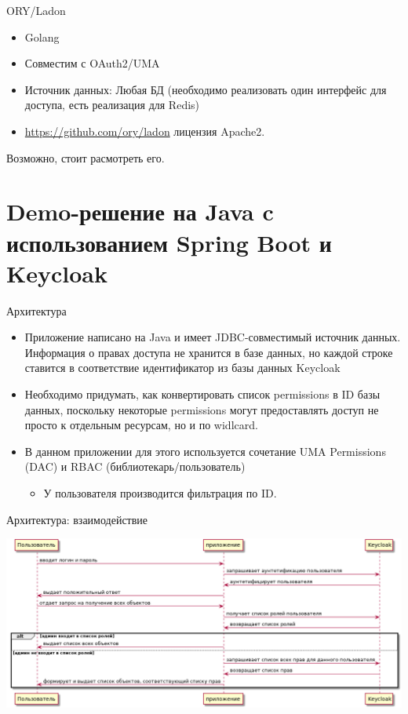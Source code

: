 \documentclass[presentation]{beamer}
\begin{document}
\begin{frame}[label={sec:org1e8935c}]{ORY/Ladon}
\begin{itemize}
\item Golang
\item Совместим с OAuth2/UMA
\item Источник данных: Любая БД (необходимо реализовать один интерфейс для доступа, есть реализация для Redis)
\item \url{https://github.com/ory/ladon} лицензия Apache2.
\end{itemize}

\begin{block}{Возможно, стоит расмотреть его.}
\end{block}
\end{frame}

\section{Demo-решение на Java c использованием Spring Boot и  Keycloak}
\label{sec:org3811f7d}
\begin{frame}[label={sec:org0ee5f39}]{Архитектура}
\begin{itemize}
\item Приложение написано на Java и имеет JDBC-совместимый источник данных. Информация о правах доступа не хранится в базе данных, но каждой строке ставится в соответствие идентификатор из базы данных \alert{Keycloak}

\item Необходимо придумать, как конвертировать список permissions в ID базы данных, поскольку некоторые permissions могут предоставлять доступ не просто к отдельным ресурсам, но и по widlcard.

\item В данном приложении для этого используется сочетание UMA Permissions (DAC) и RBAC (библиотекарь/пользователь)
\begin{itemize}
\item У пользователя производится фильтрация по ID.
\end{itemize}
\end{itemize}
\end{frame}



\begin{frame}[label={sec:orgc247a04}]{Архитектура: взаимодействие}
\begin{center}
\includegraphics[width=.9\linewidth]{img/arch.png}
\end{center}
\end{frame}
\end{document}

